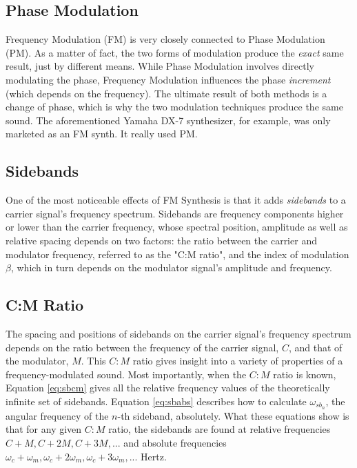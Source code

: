   \subsection{Phase Modulation}

  Frequency Modulation (FM) is very closely connected to Phase Modulation (PM). As a matter of fact, the two forms of modulation produce the \emph{exact} same result, just by different means. While Phase Modulation involves directly modulating the phase, Frequency Modulation influences the phase \emph{increment} (which depends on the frequency). The ultimate result of both methods is a change of phase, which is why the two modulation techniques produce the same sound. The aforementioned Yamaha DX-7 synthesizer, for example, was only marketed as an FM synth. It really used PM.

  \subsection{Sidebands}

  One of the most noticeable effects of FM Synthesis is that it adds \emph{sidebands} to a carrier signal's frequency spectrum. Sidebands are frequency components higher or lower than the carrier frequency, whose spectral position, amplitude as well as relative spacing depends on two factors: the ratio between the carrier and modulator frequency, referred to as the "C:M ratio", and the index of modulation $\beta$, which in turn depends on the modulator signal's amplitude and frequency.

  \subsection{C:M Ratio}

  The spacing and positions of sidebands on the carrier signal's frequency spectrum depends on the ratio between the frequency of the carrier signal, $C$, and that of the modulator, $M$. This $C:M$ ratio gives insight into a variety of properties of a frequency-modulated sound. Most importantly, when the $C:M$ ratio is known, Equation \ref{eq:sbcm} gives all the relative frequency values of the theoretically infinite set of sidebands. Equation \ref{eq:sbabs} describes how to calculate $\omega_{sb_{n}}$, the angular frequency of the $n$-th sideband, absolutely. What these equations show is that for any given $C:M$ ratio, the sidebands are found at relative frequencies $C + M, C + 2M, C + 3M, ... $ and absolute frequencies %
  $\omega_{c} + \omega_{m}, \omega_{c} + 2 \omega_{m},\omega_{c} + 3 \omega_{m}, ...$ Hertz.

